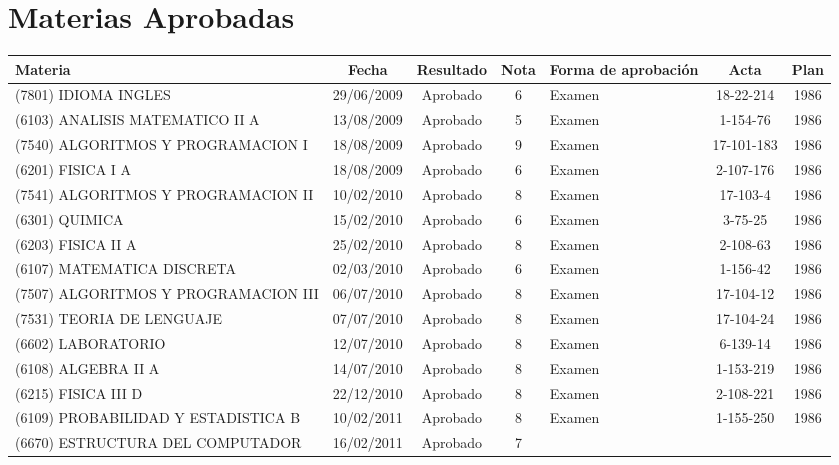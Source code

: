 \documentclass[a4paper,10pt]{article}
\begin{document}
	\section{Materias Aprobadas}	
	\begin{center}
		\scriptsize
		\centering
		\begin{longtable}{|p{3.5cm}|c|c|c|p{1.4cm}|c|c|}
			\hline 
			\bfseries Materia & \bfseries Fecha & \bfseries Resultado & 
			\bfseries Nota & \bfseries Forma de aprobación & \bfseries Acta & 
		 	\bfseries	Plan \\
			\hline
			(7801) IDIOMA INGLES & 29/06/2009 & Aprobado & 6 & Examen & 
			18-22-214 & 1986 \\
			\hline
			(6103) ANALISIS MATEMATICO II A & 13/08/2009 & Aprobado & 5 & Examen
			& 1-154-76 & 1986 \\
			\hline
			(7540) ALGORITMOS Y PROGRAMACION I & 18/08/2009 & Aprobado & 9 & 
			Examen & 17-101-183 & 1986 \\
			\hline
			(6201) FISICA I A & 18/08/2009 & Aprobado & 6 & Examen & 2-107-176 &
			1986 \\
			\hline
			(7541) ALGORITMOS Y PROGRAMACION II & 10/02/2010 & Aprobado & 8 & 
			Examen & 17-103-4 & 1986 \\
			\hline
			(6301) QUIMICA & 15/02/2010 & Aprobado & 6 & Examen & 3-75-25 & 1986
			\\
			\hline
			(6203) FISICA II A & 25/02/2010 & Aprobado & 8 & Examen & 2-108-63 &
			1986 \\
			\hline
			(6107) MATEMATICA DISCRETA & 02/03/2010 & Aprobado & 6 & Examen & 
			1-156-42 & 1986 \\
			\hline
			(7507) ALGORITMOS Y PROGRAMACION III & 06/07/2010 & Aprobado & 8 & 
			Examen & 17-104-12 & 1986 \\
			\hline
			(7531) TEORIA DE LENGUAJE & 07/07/2010 & Aprobado & 8 & Examen & 
			17-104-24 & 1986 \\
			\hline
			(6602) LABORATORIO & 12/07/2010 & Aprobado & 8 & Examen & 6-139-14 &
			1986 \\
			\hline
			(6108) ALGEBRA II A & 14/07/2010 & Aprobado & 8 & Examen & 1-153-219
			& 1986 \\
			\hline
			(6215) FISICA III D & 22/12/2010 & Aprobado & 8 & Examen & 2-108-221
			& 1986 \\
			\hline
			(6109) PROBABILIDAD Y ESTADISTICA B & 10/02/2011 & Aprobado & 8 & 
			Examen & 1-155-250 & 1986 \\
			\hline
			(6670) ESTRUCTURA DEL COMPUTADOR & 16/02/2011 & Aprobado & 7 & 

\end{longtable}
\end{center}
\end{document}
